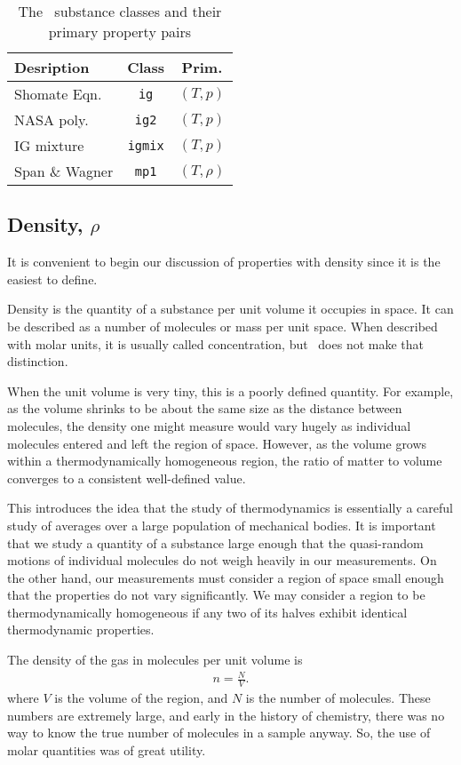 \begin{table}
\centering
\caption{The \PM\ substance classes and their primary property pairs}\label{tab:primary}
\begin{tabular}{|lcc|}
\hline
Desription & Class & Prim.\\
\hline
Shomate Eqn. & \verb|ig| & $(T,p)$\\
NASA poly. & \verb|ig2| & $(T,p)$\\
IG mixture & \verb|igmix| & $(T,p)$\\
Span \& Wagner & \verb|mp1| & $(T,\rho)$\\
\hline
\end{tabular}
\end{table}

\subsection{Density, $\rho$}

It is convenient to begin our discussion of properties with density since it is the easiest to define.

Density is the quantity of a substance per unit volume it occupies in space.  It can be described as a number of molecules or mass per unit space.  When described with molar units, it is usually called concentration, but \PM\ does not make that distinction.

When the unit volume is very tiny, this is a poorly defined quantity.  For example, as the volume shrinks to be about the same size as the distance between molecules, the density one might measure would vary hugely as individual molecules entered and left the region of space.  However, as the volume grows within a thermodynamically homogeneous region, the ratio of matter to volume converges to a consistent well-defined value.

This introduces the idea that the study of thermodynamics is essentially a careful study of averages over a large population of mechanical bodies.  It is important that we study a quantity of a substance large enough that the quasi-random motions of individual molecules do not weigh heavily in our measurements.  On the other hand, our measurements must consider a region of space small enough that the properties do not vary significantly.  We may consider a region to be thermodynamically homogeneous if any two of its halves exhibit identical thermodynamic properties.

The density of the gas in molecules per unit volume is
\begin{align}
n = \frac{N}{V}.
\end{align}
where $V$ is the volume of the region, and $N$ is the number of molecules.  These numbers are extremely large, and early in the history of chemistry, there was no way to know the true number of molecules in a sample anyway.  So, the use of molar quantities was of great utility.

